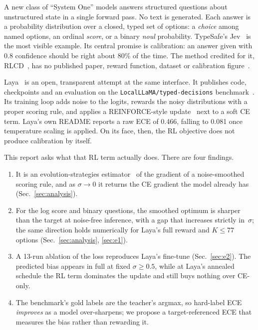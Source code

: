 \documentclass[conference]{IEEEtran}
\begin{document}
A new class of ``System One'' models answers structured questions about
unstructured state in a single forward pass. No text is generated. Each
answer is a probability distribution over a closed, typed set of options: a
\emph{choice} among named options, an ordinal \emph{score}, or a binary
\emph{noul} probability. TypeSafe's Jev~\cite{typesafe_blog} is the most
visible example. Its central promise is calibration: an answer given with 0.8
confidence should be right about 80\% of the time. The method credited for
it, RLCD~\cite{rlcd_explained}, has no published paper, reward function,
dataset or calibration figure~\cite{typesafe_blog,techcrunch_jev}.

Laya~\cite{laya_repo} is an open, transparent attempt at the same interface.
It publishes code, checkpoints and an evaluation on the
\texttt{LocalLLaMA/typed-decisions} benchmark~\cite{typed_decisions_ds}. Its
training loop adds noise to the logits, rewards the noisy distributions with a
proper scoring rule, and applies a REINFORCE-style
update~\cite{williams1992reinforce} next to a soft CE term. Laya's own README
reports a raw ECE of 0.466, falling to 0.081 once temperature scaling is
applied. On its face, then, the RL objective does not produce calibration by
itself.

This report asks what that RL term actually does. There are four findings.
\begin{enumerate}
\item It is an evolution-strategies
  estimator~\cite{salimans2017es,nesterov2017random} of the gradient of a
  noise-smoothed scoring rule, and as $\sigma\to 0$ it returns the CE gradient
  the model already has (Sec.~\ref{sec:analysis}).
\item For the log score and binary questions, the smoothed optimum is sharper
  than the target at noise-free inference, with a gap that increases strictly
  in~$\sigma$; the same direction holds numerically for Laya's full reward and
  $K\le 77$ options (Sec.~\ref{sec:analysis}, \ref{sec:e1}).
\item A 13-run ablation of the loss reproduces Laya's fine-tune
  (Sec.~\ref{sec:e2}). The predicted bias appears in full at fixed
  $\sigma\ge 0.5$, while at Laya's annealed schedule the RL term dominates the
  update and still buys nothing over CE-only.
\item The benchmark's gold labels are the teacher's argmax, so hard-label ECE
  \emph{improves} as a model over-sharpens; we propose a target-referenced ECE
  that measures the bias rather than rewarding it.
\end{enumerate}
\end{document}
